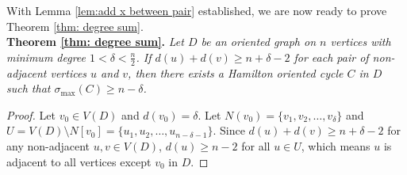 \documentclass[11pt]{article}
\newcommand{\QG}[1]{{#1}}
\newcommand{\2}{\vspace{0.2cm}}
\begin{document}
\vspace{2mm}
	
    \QG{With Lemma \ref{lem:add x between pair} established, we are now ready to prove Theorem \ref{thm: degree sum}.}\\
	
    \QG{\noindent\textbf{Theorem \ref{thm: degree sum}.} \textit{Let $D$ be an oriented graph on $n$ vertices with minimum degree $1<\delta<\frac{n}{2}$. If $d(u)+d(v)\ge n+\delta-2$ for each pair of non-adjacent vertices $u$ and $v$, then there exists a Hamilton oriented cycle $C$ in $D$ such that $\sigma_{\max}(C) \ge n-\delta$.}}

	\begin{proof}
    Let $v_0\in V(D)$ and $d(v_0)=\delta$. Let $N(v_0)=\{v_1,v_2,\ldots,v_{\delta}\}$ and $U=V(D)\setminus N[v_0]=\{u_1,u_2,\ldots, u_{n-\delta-1}\}$. Since $d(u)+d(v)\ge n+\delta-2$ for any non-adjacent $u,v \in V(D)$, $d(u)\ge n-2$ for all $u\in U$, which means $u$ is adjacent to all vertices except $v_0$ in $D$.
		

\end{proof}
\end{document}

